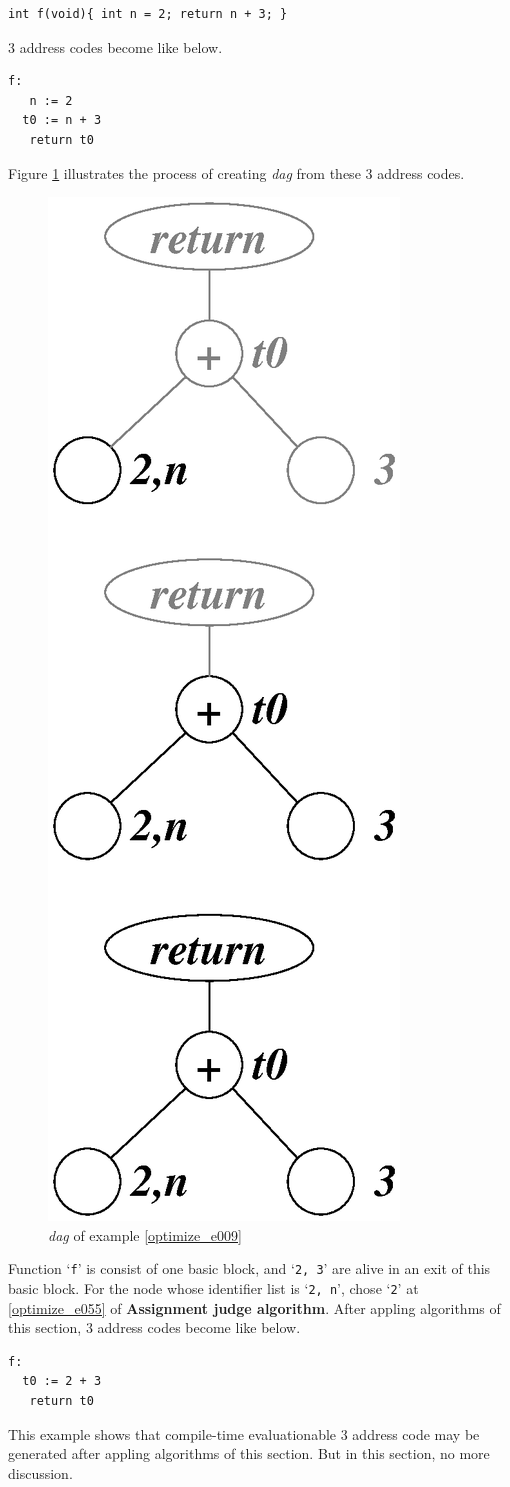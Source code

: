 \begin{Example}
\label{optimize_e009}
\begin{verbatim}
int f(void){ int n = 2; return n + 3; }
\end{verbatim}
3 address codes become like below.
\begin{verbatim}
f:
   n := 2
  t0 := n + 3
   return t0
\end{verbatim}
Figure \ref{optimize_e010} illustrates the process of creating
{\em dag} from these 3 address codes.
\begin{figure}[htbp]
\begin{center}
\includegraphics[width=0.392\linewidth,height=1.0\linewidth]{opt002.eps}
\caption{{\em dag} of example \ref{optimize_e009}}
\label{optimize_e010}
\end{center}
\end{figure}
Function `{\tt{f}}' is consist of one basic block, and 
`{\tt{2, 3}}' are alive in an exit of this basic block.
For the node whose identifier list is `{\tt{2, n}}',
chose `{\tt{2}}' at \ref{optimize_e055} of {\bf Assignment judge algorithm}.
After appling algorithms of this section,
3 address codes become like below.
\begin{verbatim}
f:
  t0 := 2 + 3
   return t0
\end{verbatim}
This example shows that
compile-time evaluationable 3 address code may be generated
after appling algorithms of this section. But in this section,
no more discussion.
\end{Example}

